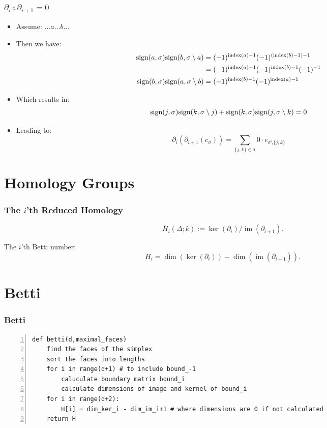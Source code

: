 \documentclass{beamer}
\DeclareMathOperator{\im}{im}
\begin{document}
\begin{frame}
\frametitle{$\partial_{i}\circ \partial_{i+1}=0$}
\begin{itemize}
\item Assume: $\dots a \dots b \dots$
\item Then we have:
\begin{align*}
\textnormal{sign}(a,\sigma)\textnormal{sign}(b,\sigma\setminus a) &= (-1)^{\textnormal{index}(a)-1}(-1)^{(\textnormal{index}(b)-1)-1}\\
&= (-1)^{\textnormal{index}(a)-1}(-1)^{\textnormal{index}(b)-1}(-1)^{-1}\\
\textnormal{sign}(b,\sigma)\textnormal{sign}(a,\sigma\setminus b) &= (-1)^{\textnormal{index}(b)-1}(-1)^{\textnormal{index}(a)-1}\\
\end{align*} \pause
\item Which results in:
\begin{equation*}
\textnormal{sign}(j,\sigma)\textnormal{sign}(k,\sigma\setminus j) + \textnormal{sign}(k,\sigma)\textnormal{sign}(j,\sigma\setminus k) = 0
\end{equation*}\pause
\item Leading to:
\begin{equation*}
\partial_i(\partial_{i+1}(e_\sigma))=\sum_{\{j,k\}\in\sigma}0\cdot e_{\sigma\setminus\{j,k\}}
\end{equation*}
\end{itemize}
\end{frame}

\section{Homology Groups}
\begin{frame}
\frametitle{The $i$'th Reduced Homology}
\begin{equation*}
\bar{H}_i(\Delta;k):=\ker(\partial_i)/\im(\partial_{i+1}).
\end{equation*}

The $i$'th Betti number:
\begin{equation*}
H_i = \dim(\ker(\partial_i))-\dim(\im(\partial_{i+1})).
\end{equation*}
\end{frame}

\section{Betti}
\begin{frame}[fragile]
\frametitle{Betti}
\begin{lstlisting}[numbers=left]
def betti(d,maximal_faces)
    find the faces of the simplex 
    sort the faces into lengths
    for i in range(d+1) # to include bound_-1
        caluculate boundary matrix bound_i
        calculate dimensions of image and kernel of bound_i
    for i in range(d+2):
        H[i] = dim_ker_i - dim_im_i+1 # where dimensions are 0 if not calculated
    return H
\end{lstlisting}
\end{frame}
\end{document}
